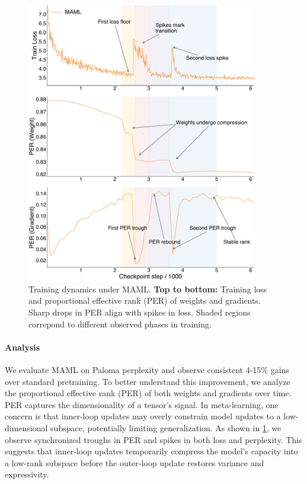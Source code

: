 \begin{figure}[h!]
    \centering
    \includegraphics[width=0.9\textwidth]{chapters/pico/figures/maml-example.pdf}
    \caption{Training dynamics under MAML.
    \textbf{Top to bottom:} Training loss and proportional effective rank (PER) of weights and gradients.
    Sharp drops in PER align with spikes in loss. Shaded regions correpond to different observed phases in training. 
    }
    \label{fig:maml_example}
\end{figure}


\paragraph{Analysis} We evaluate MAML on Paloma perplexity and observe consistent 4-15\% gains over standard pretraining. To better understand this improvement, we analyze the proportional effective rank (PER) \citep{diehlmartinez2024tending} of both weights and gradients over time. PER captures the dimensionality of a tensor's signal. In meta-learning, one concern is that inner-loop updates may overly constrain model updates to a low-dimensional subspace, potentially limiting generalization. As shown in \cref{fig:maml_example}, we observe synchronized troughs in PER and spikes in both loss and perplexity. This suggests that inner-loop updates temporarily compress the model's capacity into a low-rank subspace before the outer-loop update restores variance and expressivity.

